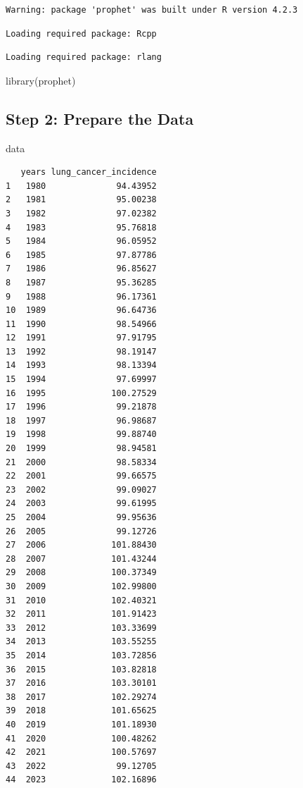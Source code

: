 \documentclass[
  letterpaper,
  DIV=11,
  numbers=noendperiod]{scrartcl}
\newenvironment{Shaded}{\begin{snugshade}}{\end{snugshade}}
\newcommand{\FunctionTok}[1]{\textcolor[rgb]{0.28,0.35,0.67}{#1}}
\newcommand{\NormalTok}[1]{\textcolor[rgb]{0.00,0.23,0.31}{#1}}
\begin{document}
\begin{verbatim}
Warning: package 'prophet' was built under R version 4.2.3
\end{verbatim}

\begin{verbatim}
Loading required package: Rcpp
\end{verbatim}

\begin{verbatim}
Loading required package: rlang
\end{verbatim}

\begin{Shaded}
\begin{Highlighting}[]
\FunctionTok{library}\NormalTok{(prophet)}
\end{Highlighting}
\end{Shaded}

\hypertarget{step-2-prepare-the-data-1}{%
\subsection{Step 2: Prepare the Data}\label{step-2-prepare-the-data-1}}

\begin{Shaded}
\begin{Highlighting}[]
\NormalTok{data}
\end{Highlighting}
\end{Shaded}

\begin{verbatim}
   years lung_cancer_incidence
1   1980              94.43952
2   1981              95.00238
3   1982              97.02382
4   1983              95.76818
5   1984              96.05952
6   1985              97.87786
7   1986              96.85627
8   1987              95.36285
9   1988              96.17361
10  1989              96.64736
11  1990              98.54966
12  1991              97.91795
13  1992              98.19147
14  1993              98.13394
15  1994              97.69997
16  1995             100.27529
17  1996              99.21878
18  1997              96.98687
19  1998              99.88740
20  1999              98.94581
21  2000              98.58334
22  2001              99.66575
23  2002              99.09027
24  2003              99.61995
25  2004              99.95636
26  2005              99.12726
27  2006             101.88430
28  2007             101.43244
29  2008             100.37349
30  2009             102.99800
31  2010             102.40321
32  2011             101.91423
33  2012             103.33699
34  2013             103.55255
35  2014             103.72856
36  2015             103.82818
37  2016             103.30101
38  2017             102.29274
39  2018             101.65625
40  2019             101.18930
41  2020             100.48262
42  2021             100.57697
43  2022              99.12705
44  2023             102.16896
\end{verbatim}
\end{document}

